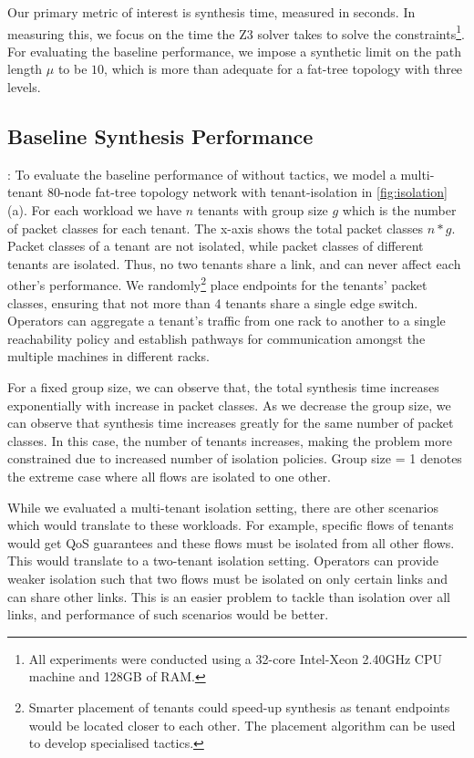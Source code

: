 Our primary metric of interest is synthesis time, measured in
seconds. In measuring this, we focus on the time the Z3 solver takes
to solve the constraints\footnote{All experiments were conducted using a
	32-core Intel-Xeon 2.40GHz CPU machine and
	128GB of RAM.}. For evaluating the baseline performance, we impose a
synthetic limit on the path length $\mu$ to be $10$, which is more than adequate 
for a fat-tree topology with three levels. 

\subsection{Baseline Synthesis Performance} \label{sec:baselineeval} 
: To evaluate the baseline performance of \Name without tactics, we model a multi-tenant
80-node fat-tree topology network with   
tenant-isolation in \cref{fig:isolation}(a). 
For each workload we have $n$ tenants with group size $g$ which 
is the number of packet classes for each tenant. The x-axis shows the total packet classes $n*g$. 
Packet classes of a tenant are not isolated, while packet classes
of different tenants are isolated. Thus, no two tenants share a link, and can never affect
each other's performance.
We randomly\footnote{
	Smarter placement of tenants could speed-up synthesis as tenant endpoints would
	be located closer to each other. The placement algorithm can be used to develop specialised tactics.}
  place endpoints for the tenants' packet classes, ensuring that not more than 4 tenants share a single edge switch.
   Operators can aggregate a tenant's traffic from one rack to
another to a single reachability policy and establish pathways for communication amongst the multiple
machines in different racks. 

For a fixed group size, we can observe that,
the total synthesis time increases exponentially with increase in packet classes.
 As we decrease the group size,
 we can observe that synthesis time increases greatly for the same number of packet classes.
 In this case, the number of tenants increases, making the problem more constrained 
  due to increased number of isolation policies. 
 Group size = 1 denotes the extreme case where all flows are isolated to one other. 
 
 While we evaluated a multi-tenant isolation setting, there are other scenarios
 which would translate to these workloads. For example, specific flows of 
 tenants would get QoS guarantees and these flows must be isolated from all
 other flows. This would translate to a two-tenant isolation setting. Operators 
 can provide weaker isolation such that two flows must be isolated on only certain 
 links and can share other links. This is an easier problem to tackle than isolation over
 all links, and performance of such scenarios would be better.

